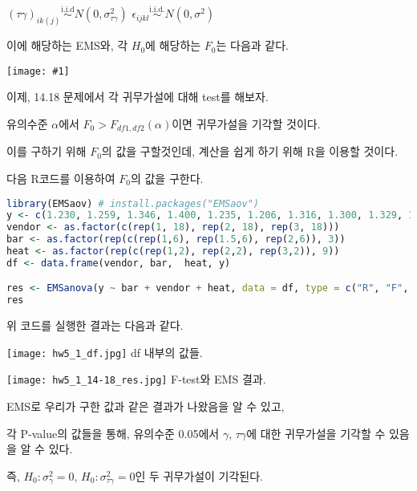 \documentclass{article}
\newlength{\textundbildtextheight}
\newcommand{\printimage}[1]{
\vfill
\begin{center}
\texttt{[image: \#1]}
\end{center}
\vfill
}
\begin{document}
$(\tau \gamma)_{ik(j)} \overset{\text{i.i.d}}{\sim} N(0, \sigma_{\tau \gamma}^2)$
$\epsilon_{ijkl}  \overset{\text{i.i.d.}}{\sim} N(0, \sigma^2)$


이에 해당하는 EMS와, 각 $H_0$에 해당하는 $F_0$는 다음과 같다.

\printimage{hw5_1_14-18_EMS.jpg}


이제, 14.18 문제에서 각 귀무가설에 대해 test를 해보자.

유의수준 $\alpha$에서 $F_0 > F_{df1, df2}(\alpha)$이면 귀무가설을 기각할 것이다.

이를 구하기 위해 $F_0$의 값을 구할것인데, 계산을 쉽게 하기 위해 R을 이용할 것이다.

다음 R코드를 이용하여 $F_0$의 값을 구한다.



\begin{lstlisting}[language=R]
library(EMSaov) # install.packages("EMSaov")
y <- c(1.230, 1.259, 1.346, 1.400, 1.235, 1.206, 1.316, 1.300, 1.329, 1.362, 1.250, 1.239, 1.287, 1.292, 1.346, 1.382, 1.273, 1.215, 1.301, 1.263, 1.346, 1.392, 1.315, 1.320, 1.274, 1.268, 1.384, 1.375, 1.346, 1.357, 1.247, 1.215, 1.362, 1.328, 1.336, 1.342, 1.247, 1.296, 1.275, 1.268, 1.324, 1.315, 1.273, 1.264, 1.260, 1.265, 1.392, 1.364, 1.301, 1.262, 1.280, 1.271, 1.319, 1.323)
vendor <- as.factor(c(rep(1, 18), rep(2, 18), rep(3, 18)))
bar <- as.factor(rep(c(rep(1,6), rep(1.5,6), rep(2,6)), 3))
heat <- as.factor(rep(c(rep(1,2), rep(2,2), rep(3,2)), 9))
df <- data.frame(vendor, bar,  heat, y)

res <- EMSanova(y ~ bar + vendor + heat, data = df, type = c("R", "F", "R"), nested = c(NA, NA, "vendor"))
res
\end{lstlisting}

위 코드를 실행한 결과는 다음과 같다.


\begin{center}
    \texttt{[image: hw5\_1\_df.jpg]}
df 내부의 값들.
\end{center} 

\begin{center}
    \texttt{[image: hw5\_1\_14-18\_res.jpg]}
F-test와 EMS 결과.
\end{center} 

EMS로 우리가 구한 값과 같은 결과가 나왔음을 알 수 있고,

각 P-value의 값들을 통해, 유의수준 0.05에서 $\gamma$, $\tau \gamma$에 대한 귀무가설을 기각할 수 있음을 알 수 있다.

즉, $H_0 : \sigma^2_{\gamma} = 0$, $H_0 : \sigma^2_{\tau \gamma} = 0$인 두 귀무가설이 기각된다.
\end{document}
